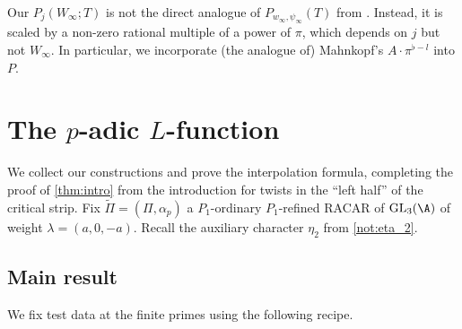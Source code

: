 \documentclass[10pt,reqno,a4paper]{amsart}
\newcommand{\Poref}{\tilde\Pi}
\newcommand{\GL}{\mathrm{GL}}
\begin{document}
\begin{remark}\label{rem:P}
Our $P_j(W_\infty;T)$ is not the direct analogue of $P_{w_\infty,\psi_\infty}(T)$ from \cite{Mah00}. Instead, it is scaled by a non-zero rational multiple of a power of $\pi$, which depends on $j$ but not $W_\infty$. In particular, we incorporate (the analogue of) Mahnkopf's $A\cdot \pi^{\flat-l}$ into $P$.
\end{remark}



\section{The \texorpdfstring{$p$-adic $L$-function}{p-adic L-function}}\label{sec:p-adic L-function}

We collect our constructions and prove the interpolation formula, completing the proof of \cref{thm:intro} from the introduction for twists in the ``left half'' of the critical strip. Fix $\Poref = (\Pi,\alpha_p)$ a $P_1$-ordinary $P_1$-refined RACAR of $\GL_3(\A)$ of weight $\lambda = (a,0,-a)$. Recall the auxiliary character $\eta_{2}$ from \cref{not:eta_2}.


\subsection{Main result}
 We fix test data at the finite primes using the following recipe.
\end{document}
